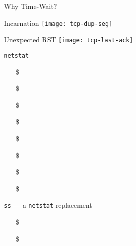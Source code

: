\begin{frame}{Why Time-Wait?}
  \begin{minipage}[b]{.45\linewidth}
    \begin{iblock}{Incarnation}
      \texttt{[image: tcp-dup-seg]}
    \end{iblock}
  \end{minipage}\hfill
  \begin{minipage}[b]{.45\linewidth}
    \begin{iblock}{Unexpected RST}
      \texttt{[image: tcp-last-ack]}
    \end{iblock}
  \end{minipage}  
\end{frame}

\begin{frame}{\texttt{netstat}}
  
  \begin{minipage}[t]{.35\linewidth}
    \begin{itemize}
    \item[\$] 
    \item[\$] 
    \item[\$] 
    \item[\$] 
    \end{itemize}
  \end{minipage}\hfill
  \begin{minipage}[t]{.6\linewidth}
    \begin{itemize}
    \item[\$] 
    \item[\$] 
    \item[\$] 
    \item[\$] 
    \end{itemize}
  \end{minipage}
  
  \begin{block}{\texttt{ss} --- a \texttt{netstat} replacement}
    \begin{itemize}
    \item[\$] 
    \item[\$] 
    \end{itemize}
  \end{block}
\end{frame}

